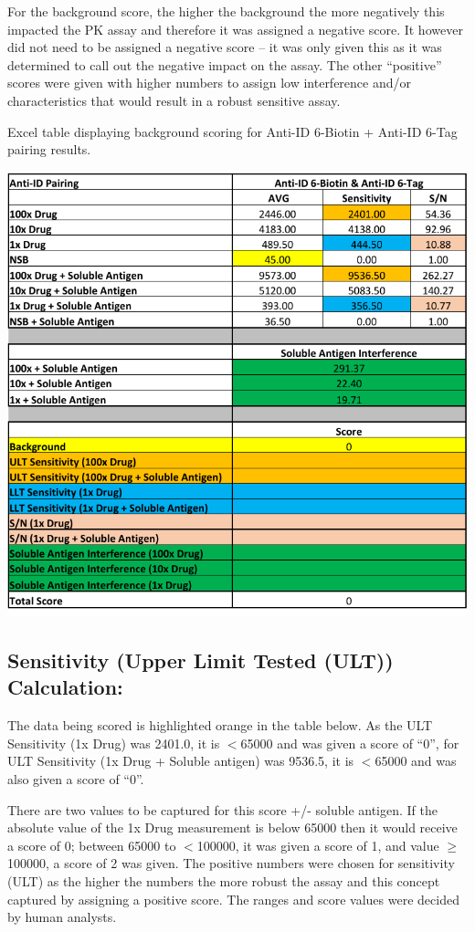 For the background score, the higher the background the more negatively this impacted the PK assay and therefore it was assigned a negative score.  It however did not need to be assigned a negative score – it was only given this as it was determined to call out the negative impact on the assay.  The other “positive” scores were given with higher numbers to assign low interference and/or characteristics that would result in a robust sensitive assay.  

\vspace{-1cm}
\begin{table}[ht]
 \centering
 \caption{Excel table displaying background scoring for Anti-ID 6-Biotin + Anti-ID 6-Tag pairing results.}
 \includegraphics{graphics/ch3/Table_3.pdf}
\end{table} 

\subsection*{Sensitivity (Upper Limit Tested (ULT)) Calculation:}
The data being scored is highlighted orange in the table below.  As the ULT Sensitivity (1x Drug) was 2401.0, it is $<$65000 and was given a score of “0”, for ULT Sensitivity (1x Drug + Soluble antigen) was 9536.5, it is $<$65000 and was also given a score of “0”.

There are two values to be captured for this score +/- soluble antigen.  If the absolute value of the 1x Drug measurement is below 65000 then it would receive a score of 0; between 65000 to $<$100000, it was given a score of 1, and value $\geq$100000, a score of 2 was given.  The positive numbers were chosen for sensitivity (ULT) as the higher the numbers the more robust the assay and this concept captured by assigning a positive score.  The ranges and score values were decided by human analysts.


